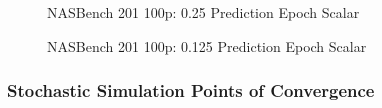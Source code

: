 \documentclass[twocolumn]{article}
\begin{document}
\begin{figure}[!h]
    \begin{center}
        \resizebox{0.95\columnwidth}{!}{
            
        }
        \caption{NASBench 201 100p: 0.25 Prediction Epoch Scalar}
        \label{fig:nasbench_100_4x_acceleration}
    \end{center}
\end{figure}

\begin{figure}[!h]
    \begin{center}
        \resizebox{0.95\columnwidth}{!}{
            
        }
        \caption{NASBench 201 100p: 0.125 Prediction Epoch Scalar}
        \label{fig:nasbench_100_8x_acceleration}
    \end{center}
\end{figure}


\clearpage
\FloatBarrier
\onecolumn
\subsubsection{Stochastic Simulation Points of Convergence}
\end{document}
